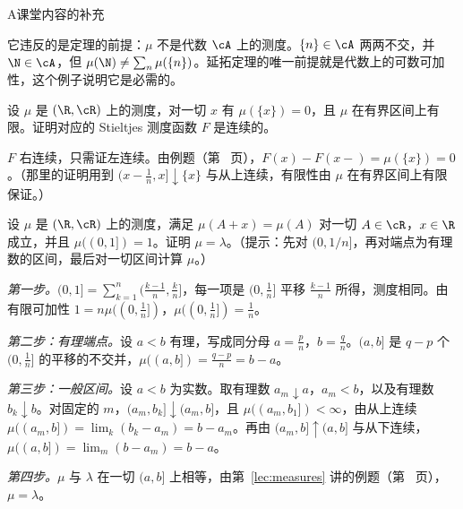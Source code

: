 \begin{exercises}{A}{课堂内容的补充}
\begin{solution}
它违反的是定理的前提：$\mu$ 不是代数 $\cA$ 上的测度。$\{n\}\in\cA$ 两两不交，并 $\N\in\cA$，但 $\mu(\N)\neq\sum_n\mu(\{n\})$。延拓定理的唯一前提就是代数上的可数可加性，这个例子说明它是必需的。
\end{solution}

\item\label{ex:extension:A9} 设 $\mu$ 是 $(\R,\cR)$ 上的测度，对一切 $x$ 有 $\mu(\{x\})=0$，且 $\mu$ 在有界区间上有限。证明对应的 Stieltjes 测度函数 $F$ 是连续的。
\begin{solution}
$F$ 右连续，只需证左连续。由例题（第~\pageref{we:extension:atoms} 页），$F(x)-F(x-)=\mu(\{x\})=0$。（那里的证明用到 $(x-\frac1n,x]\downarrow\{x\}$ 与从上连续，有限性由 $\mu$ 在有界区间上有限保证。）
\end{solution}

\item\label{ex:extension:A10} 设 $\mu$ 是 $(\R,\cR)$ 上的测度，满足 $\mu(A+x)=\mu(A)$ 对一切 $A\in\cR$，$x\in\R$ 成立，并且 $\mu((0,1])=1$。证明 $\mu=\lambda$。（提示：先对 $(0,1/n]$，再对端点为有理数的区间，最后对一切区间计算 $\mu$。）
\begin{solution}
\emph{第一步。}$(0,1]=\sum_{k=1}^n(\frac{k-1}n,\frac kn]$，每一项是 $(0,\frac1n]$ 平移 $\frac{k-1}n$ 所得，测度相同。由有限可加性 $1=n\mu((0,\frac1n])$，$\mu((0,\frac1n])=\frac1n$。

\emph{第二步：有理端点。}设 $a<b$ 有理，写成同分母 $a=\frac pn$，$b=\frac qn$。$(a,b]$ 是 $q-p$ 个 $(0,\frac1n]$ 的平移的不交并，$\mu((a,b])=\frac{q-p}n=b-a$。

\emph{第三步：一般区间。}设 $a<b$ 为实数。取有理数 $a_m\downarrow a$，$a_m<b$，以及有理数 $b_k\downarrow b$。对固定的 $m$，$(a_m,b_k]\downarrow(a_m,b]$，且 $\mu((a_m,b_1])<\infty$，由从上连续 $\mu((a_m,b])=\lim_k(b_k-a_m)=b-a_m$。再由 $(a_m,b]\uparrow(a,b]$ 与从下连续，$\mu((a,b])=\lim_m(b-a_m)=b-a$。

\emph{第四步。}$\mu$ 与 $\lambda$ 在一切 $(a,b]$ 上相等，由第~\ref{lec:measures} 讲的例题（第~\pageref{we:measures:uniqueness-lebesgue} 页），$\mu=\lambda$。
\end{solution}
\end{exercises}

